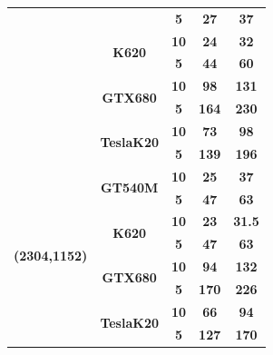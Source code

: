 \documentclass[conference]{IEEEtran}
\begin{document}
\begin{table}[h]
\begin{tabular}{@{}cc|c|cc@{}}
                                     &                                    & \textbf{5}    & \textbf{27}  & \textbf{37}   \\ \cmidrule(l){2-5} 
                                     & \multirow{2}{*}{\textbf{K620}}     & \textbf{10}   & \textbf{24}  & \textbf{32}   \\ \cmidrule(l){3-5}
                                     &                                    & \textbf{5}    & \textbf{44}   & \textbf{60}   \\ \cmidrule(l){2-5}
                                     & \multirow{2}{*}{\textbf{GTX680}}   & \textbf{10}   & \textbf{98}  & \textbf{131}  \\ \cmidrule(l){3-5}
                                     &                                    & \textbf{5}    & \textbf{164}  & \textbf{230}  \\ \cmidrule(l){2-5}
                                     & \multirow{2}{*}{\textbf{TeslaK20}} & \textbf{10}   & \textbf{73}  & \textbf{98}   \\ \cmidrule(l){3-5}
                                     &                                    & \textbf{5}    & \textbf{139} & \textbf{196}  \\ \midrule
\multirow{8}{*}{\textbf{(2304,1152)}}& \multirow{2}{*}{\textbf{GT540M}}   & \textbf{10}   & \textbf{25}  & \textbf{37}   \\ \cmidrule(l){3-5} 
                                     &                                    & \textbf{5}    & \textbf{47}  & \textbf{63}   \\ \cmidrule(l){2-5} 
                                     & \multirow{2}{*}{\textbf{K620}}     & \textbf{10}   & \textbf{23}  & \textbf{31.5} \\ \cmidrule(l){3-5}
                                     &                                    & \textbf{5}    & \textbf{47}  & \textbf{63}    \\ \cmidrule(l){2-5}
                                     & \multirow{2}{*}{\textbf{GTX680}}   & \textbf{10}   & \textbf{94}  & \textbf{132}  \\ \cmidrule(l){3-5}
                                     &                                    & \textbf{5}    & \textbf{170} & \textbf{226}   \\ \cmidrule(l){2-5}
                                     & \multirow{2}{*}{\textbf{TeslaK20}} & \textbf{10}   & \textbf{66}  & \textbf{94}   \\ \cmidrule(l){3-5}
                                     &                                    & \textbf{5}    & \textbf{127} & \textbf{170}  \\ \bottomrule
\end{tabular}
\end{table}
\end{document}

